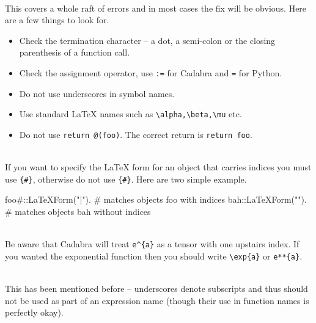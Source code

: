 \documentclass[a4paper,12pt]{article}
\numberwithin{equation}{section}%
\begin{document}
\begin{enumerate}

   \\[5pt]
   This covers a whole raft of errors and in most cases the fix will be obvious. Here are a
   few things to look for.
   \begin{itemize}
      \item Check the termination character -- a dot, a semi-colon or the closing parenthesis
            of a function call.
      \item Check the assignment operator, use \verb|:=| for Cadabra and \verb|=| for Python.
      \item Do not use underscores in symbol names.
      \item Use standard LaTeX names such as \verb|\alpha,\beta,\mu| etc.
      \item Do not use \verb|return @(foo)|. The correct return is \verb|return foo|.
   \end{itemize}

   \\[5pt]
   If you want to specify the LaTeX form for an object that carries indices you
   must use \verb|{#}|, otherwise do not use \verb|{#}|. Here are two simple example.
   \begin{cadabra}
      foo{#}::LaTeXForm("{\bar\alpha}").    # matches objects foo with indices
      bah::LaTeXForm("{\hat\beta}").        # matches objects bah without indices
   \end{cadabra}

   \\[5pt]
   Be aware that Cadabra will treat \verb|e^{a}| as a tensor with one upstairs index. If you
   wanted the exponential function then you should write \verb|\exp{a}| or \verb|e**{a}|.

   \\[5pt]
   This has been mentioned before -- underscores denote subscripts and thus should
   not be used as part of an expression name (though their use in function names is
   perfectly okay).


\end{enumerate}
\end{document}

